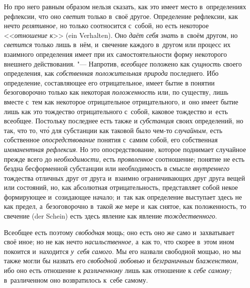 Но про него равным образом нельзя сказать, как это имеет место в~определениях
рефлексии, что оно {\em светит} только в~своё другое. Определение рефлексии,
как нечто {\em релятивное,} но только соотносится с~собой, но есть некоторое
<<{\em отношение к}>> (ein Verhalten). Оно {\em даёт себя знать} в~своём
другом, но {\em светится} только лишь в~нём, и~свечение каждого в~другом или
процесс их взаимного определения имеет при их самостоятельности форму
некоторого внешнего действования. "--- Напротив, {\em всеобщее} положено как
{\em сущность} своего определения, как {\em собственная положительная природа}
последнего. Ибо определение, составляющее его отрицательное, имеет бытие в
понятии безоговорочно только как некоторая {\em положенность} или, по существу,
лишь вместе с~тем как некоторое отрицательное отрицательного, и~оно имеет бытие
лишь как это тождество отрицательного с~собой, каковое тождество и~есть
всеобщее. Постольку последнее есть также и {\em субстанция} своих определений,
но так, что то, чт\'{о} для субстанции как таковой было чем-то {\em случайным,}
есть собственное {\em опосредствование} понятия с~самим собой, его собственная
{\em имманентная рефлексия}. Но это опосредствование, которое поднимает
случайное прежде всего до {\em необходимости,} есть {\em проявленное}
соотношение; понятие не есть бездна бесформенной субстанции или необходимость в
смысле {\em внутреннего} тождества отличных друг от друга и~взаимно
ограничивающих друг друга вещей или состояний, но, как абсолютная отрицательность,
представляет собой некое формирующее и~созидающее начало; и~так как определение
выступает здесь не как предел, а~безоговорочно в~такой же мере и~как снятое,
как положенность, то свечение (der Schein) есть здесь явление как явление
{\em тождественного}.

Всеобщее есть поэтому {\em свободная} мощь; оно есть оно же само и~захватывает
своё иное; но не как нечто {\em насильственное,} а~как то, что скорее в~этом
ином покоится и~находится {\em у~себя самого}. Мы его назвали свободной мощью,
но мы также могли бы назвать его {\em свободной любовью} и {\em безграничным
блаженством,} ибо оно есть отношение к {\em различенному} лишь как отношение
к {\em себе самому;} в~различенном оно возвратилось к~себе самому.

